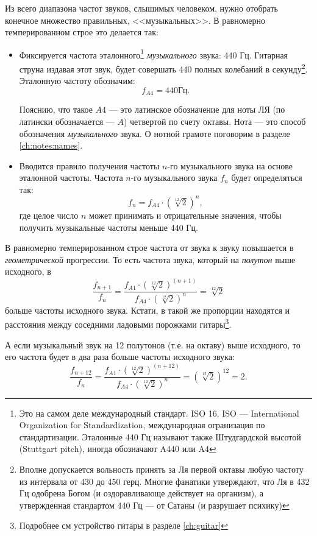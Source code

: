 Из всего диапазона частот звуков, слышимых человеком, нужно отобрать конечное множество правильных, <<музыкальных>>. В равномерно темперированном строе это делается так:
\begin{itemize}
    \item Фиксируется частота эталонного\footnote{Это на самом деле международный стандарт. ISO 16. ISO --- International Organization for Standardization, международная огранизация по стандартизации. Эталонные 440 Гц называют также Штудгардской высотой (Stuttgart pitch), иногда обозначают A440 или A4} \emph{музыкального} звука: 440 Гц. Гитарная струна издавая этот звук, будет совершать 440 полных колебаний в секунду\footnote{Вполне допускается вольность принять за Ля первой октавы любую частоту из интервала от 430 до 450 герц. Многие фанатики утверждают, что Ля в 432 Гц одобрена Богом (и оздоравливающе действует на организм), а утвержденная стандартом 440 Гц --- от Сатаны (и разрушает психику)}. Эталонную частоту обозначим: 
    \[  
        f_{A4}=440\text{Гц}.
    \]
    
    Пояснию, что такое $A4$ --- это латинское обозначение для ноты ЛЯ (по латински обозначается --- $A$) четвертой по счету октавы. Нота --- это способ обозначения \emph{музыкального} звука. О нотной грамоте поговорим в разделе \ref{ch:notes:names}.
    
    \item Вводится правило получения частоты $n$-го музыкального звука на основе эталонной частоты. Частота $n$-го музыкального звука $f_n$ будет определяться так: 
    \begin{equation}
        f_n = f_{A4}\cdot({\sqrt[12]{2}})^n, \label{eq:music:tone:frequency}
    \end{equation}
    где целое число $n$ может принимать и отрицательные значения, чтобы получить музыкальные частоты меньше 440 Гц.
\end{itemize}

В равномерно темперированном строе частота от звука к звуку повышается в \emph{геометрической} прогрессии. То есть частота звука, который на \emph{полутон} выше исходного, в 
\[
    \frac{f_{n+1}}{f_n} = \frac{f_{A1}\cdot(\sqrt[12]{2})^{(n+1)}}{f_{A4}\cdot(\sqrt[12]{2})^n} = \sqrt[12]{2}
\] 
больше частоты исходного звука. Кстати, в такой же пропорции находятся и расстояния между соседними ладовыми порожками гитары\footnote{Подробнее см устройство гитары в разделе \ref{ch:guitar}}.

А если музыкальный звук на 12 полутонов (т.е. на октаву) выше исходного, то его частота будет в два раза больше частоты исходного звука:
\[
    \frac{f_{n+12}}{f_n} = \frac{f_{A1}\cdot(\sqrt[12]{2})^{(n+12)}}{f_{A4}\cdot(\sqrt[12]{2})^n} = (\sqrt[12]{2})^{12} = 2.
\]

